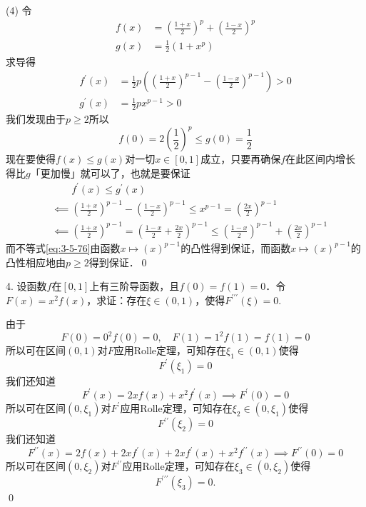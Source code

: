 (4) \prove 令
\begin{align}
    f(x) &= \left(\frac{1+x}{2}\right)^p + \left(\frac{1-x}{2}\right)^p \\
    g(x) &= \frac{1}{2} \left(1+x^p\right)
\end{align}
求导得
\begin{align}
    f^\prime (x) &= \frac{1}{2}p\left(\left(\frac{1+x}{2}\right)^{p-1}-\left(\frac{1-x}{2}\right)^{p-1}\right) > 0 \\
    g^\prime (x) &= \frac{1}{2}px^{p-1} > 0
\end{align}
我们发现由于$p \geq 2$所以
\begin{equation}
    f(0) = 2 \left(\frac{1}{2}\right)^p \leq g(0) = \frac{1}{2}
\end{equation}
现在要使得$f(x) \leq g(x)$对一切$x \in [0,1]$成立，只要再确保$f$在此区间内增长得比$g$「更加慢」就可以了，也就是要保证
\begin{align}
    &\mathrel{\phantom{\impliedby}} f^\prime (x) \leq g^{\prime} (x) \\
    &\impliedby \left(\frac{1+x}{2}\right)^{p-1} - \left(\frac{1-x}{2}\right)^{p-1} \leq x^{p-1} = \left(\frac{2x}{2}\right)^{p-1} \\
    &\impliedby \left(\frac{1+x}{2}\right)^{p-1} = \left(\frac{1-x}{2} + \frac{2x}{2}\right)^{p-1} \leq \left(\frac{1-x}{2}\right)^{p-1} + \left(\frac{2x}{2}\right)^{p-1} \label{eq:3-5-76}
\end{align}
而不等式\ref{eq:3-5-76}由函数$x \mapsto \left(x\right)^{p-1}$的凸性得到保证，而函数$x \mapsto \left(x\right)^{p-1}$的凸性相应地由$p \geq 2$得到保证．\qed\bigskip

4. 设函数$f$在$[0,1]$上有三阶导函数，且$f(0)=f(1)=0$．令$F(x)=x^2 f(x)$，求证：存在$\xi \in (0,1)$，使得$F^{\prime\prime\prime}(\xi)=0$.

\prove 由于
\begin{equation}
    F(0) = 0^2 f(0) = 0, \quad F(1) = 1^2 f(1) = f(1) = 0
\end{equation}
所以可在区间$(0,1)$对$F$应用Rolle定理，可知存在$\xi_1 \in (0,1)$使得
\begin{equation}
    F^{\prime}(\xi_1) = 0
\end{equation}
我们还知道
\begin{equation}
    F^\prime (x) = 2x f(x) + x^2 f^{\prime} (x) \implies F^\prime (0) = 0
\end{equation}
所以可在区间$(0, \xi_1)$对$F^\prime$应用Rolle定理，可知存在$\xi_2 \in (0, \xi_1)$使得
\begin{equation}
    F^{\prime\prime}(\xi_2) = 0
\end{equation}
我们还知道
\begin{equation}
    F^{\prime\prime}(x) = 2f(x) + 2xf^{\prime}(x) + 2x f^{\prime}(x) + x^2 f^{\prime\prime}(x) \implies F^{\prime\prime}(0) = 0
\end{equation}
所以可在区间$(0, \xi_2)$对$F^{\prime\prime}$应用Rolle定理，可知存在$\xi_3 \in (0, \xi_2)$使得
\begin{equation}
    F^{\prime\prime\prime}(\xi_3) = 0.
\end{equation}
\qed\bigskip
